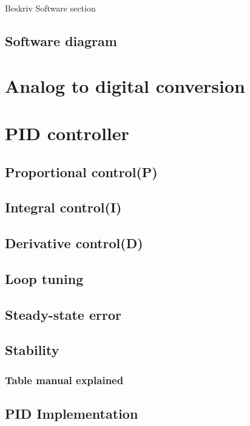 
Beskriv Software section

\subsection{Software diagram}

\section{Analog to digital conversion}

\section{PID controller} 

\subsection {Proportional control(P)}

\subsection {Integral control(I)}

\subsection {Derivative control(D)} 

\subsection {Loop tuning} 

\subsection {Steady-state error}

\subsection {Stability} 

\subsubsection {Table manual explained}

\subsection{PID Implementation}

